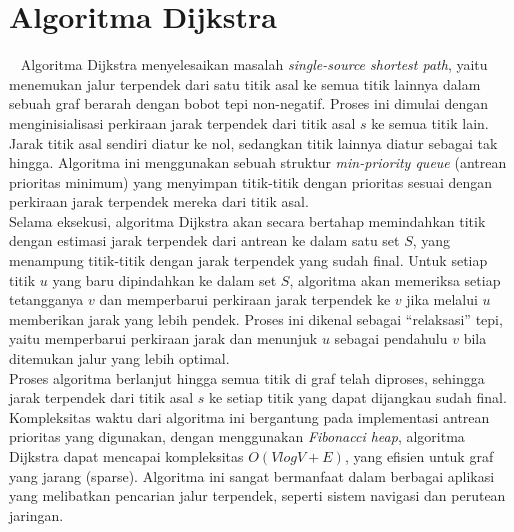 \section{Algoritma Dijkstra}
\label{sec:dijkstra}
~\cite{Cormen:09:intro}
Algoritma Dijkstra menyelesaikan masalah \textit{single-source shortest path}, yaitu menemukan jalur terpendek dari satu titik asal ke semua titik lainnya dalam sebuah graf berarah dengan bobot tepi non-negatif. Proses ini dimulai dengan menginisialisasi perkiraan jarak terpendek dari titik asal $s$ ke semua titik lain. Jarak titik asal sendiri diatur ke nol, sedangkan titik lainnya diatur sebagai tak hingga. Algoritma ini menggunakan sebuah struktur \textit{min-priority queue} (antrean prioritas minimum) yang menyimpan titik-titik dengan prioritas sesuai dengan perkiraan jarak terpendek mereka dari titik asal.
\\
Selama eksekusi, algoritma Dijkstra akan secara bertahap memindahkan titik dengan estimasi jarak terpendek dari antrean ke dalam satu set $S$, yang menampung titik-titik dengan jarak terpendek yang sudah final. Untuk setiap titik $u$ yang baru dipindahkan ke dalam set $S$, algoritma akan memeriksa setiap tetangganya $v$ dan memperbarui perkiraan jarak terpendek ke $v$ jika melalui $u$ memberikan jarak yang lebih pendek. Proses ini dikenal sebagai “relaksasi” tepi, yaitu memperbarui perkiraan jarak dan menunjuk $u$ sebagai pendahulu $v$ bila ditemukan jalur yang lebih optimal.
\\
Proses algoritma berlanjut hingga semua titik di graf telah diproses, sehingga jarak terpendek dari titik asal $s$ ke setiap titik yang dapat dijangkau sudah final. Kompleksitas waktu dari algoritma ini bergantung pada implementasi antrean prioritas yang digunakan, dengan menggunakan \textit{Fibonacci heap}, algoritma Dijkstra dapat mencapai kompleksitas $O(VlogV+E)$, yang efisien untuk graf yang jarang (sparse). Algoritma ini sangat bermanfaat dalam berbagai aplikasi yang melibatkan pencarian jalur terpendek, seperti sistem navigasi dan perutean jaringan.

